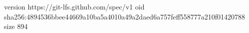 version https://git-lfs.github.com/spec/v1
oid sha256:4894536bbee44669a10ba5a4010a49a2daed6a757feff558777a210f01420788
size 894
